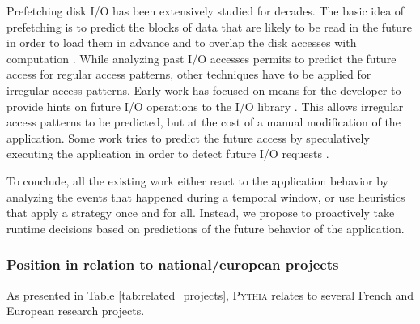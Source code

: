 \documentclass[a4paper,11pt,defblank]{article}
\newcommand{\pname}{\textsc{Pythia}\xspace}
\begin{document}
Prefetching disk I/O has been extensively studied for decades. The
basic idea of prefetching is to predict the blocks of data that are
likely to be read in the future in order to load them in advance and
to overlap the disk accesses with computation
\cite{cao1996implementation, ding2007diskseen, prefetch_liao}.
%
While analyzing past I/O accesses permits to predict the future access
for regular access patterns, other techniques have to be applied for
irregular access patterns.
%
Early work has focused on means for the developer to provide hints
on future I/O operations to the I/O library \cite{Patterson}. This
allows irregular access patterns to be predicted, but at the cost of a
manual modification of the application.
%
Some work tries to predict the future access
by speculatively executing the application in order to detect future
I/O requests \cite{chang1999automatic}.


To conclude, all the existing work either react to the application
behavior by analyzing the events that happened during a temporal
window, or use heuristics that apply a strategy once and for
all. Instead, we propose to proactively take runtime decisions based
on predictions of the future behavior of the application.

\vspace{0.5cm}
\subsubsection{Position in relation to national/european projects}

As presented in Table \ref{tab:related_projects}, \pname relates to
several French and European research projects.
\end{document}

